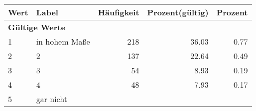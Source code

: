      \begin{longtable}{lXrrr}
     \toprule
     \textbf{Wert} & \textbf{Label} & \textbf{Häufigkeit} & \textbf{Prozent(gültig)} & \textbf{Prozent} \\
     \endhead
     \midrule
     \multicolumn{5}{l}{\textbf{Gültige Werte}}\\

     1 &
     \multicolumn{1}{X}{ in hohem Maße   } &


       \num{218} &
       \num[round-mode=places,round-precision=2]{36.03} &
         \num[round-mode=places,round-precision=2]{0.77} \\

     2 &
     \multicolumn{1}{X}{ 2   } &


       \num{137} &
       \num[round-mode=places,round-precision=2]{22.64} &
         \num[round-mode=places,round-precision=2]{0.49} \\

     3 &
     \multicolumn{1}{X}{ 3   } &


       \num{54} &
       \num[round-mode=places,round-precision=2]{8.93} &
         \num[round-mode=places,round-precision=2]{0.19} \\

     4 &
     \multicolumn{1}{X}{ 4   } &


       \num{48} &
       \num[round-mode=places,round-precision=2]{7.93} &
         \num[round-mode=places,round-precision=2]{0.17} \\

     5 &
     \multicolumn{1}{X}{ gar nicht   } &



\end{longtable}
